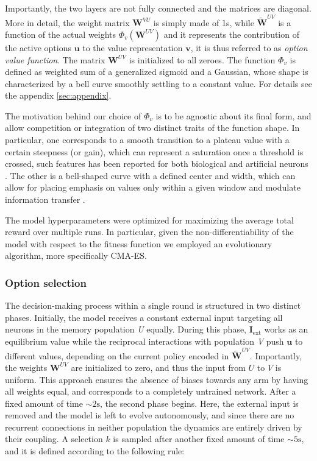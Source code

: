 \noindent Importantly, the two layers are not fully connected and the matrices are diagonal.
More in detail, the weight matrix $\textbf{W}^{VU}$ is simply made of $1$s, while $\widetilde{\textbf{W}}^{UV}$ is a function of the actual weights $\Phi_{v}(\textbf{W}^{UV})$ and it represents the contribution of the active options $\textbf{u}$ to the value representation $\textbf{v}$, it is thus
referred to as \textit{option value function}. The matrix $\textbf{W}^{UV}$ is initialized to all zeroes.
The function $\Phi_{v}$ is defined as weighted sum of a generalized sigmoid and a Gaussian, whose shape is characterized by a bell curve smoothly settling to a constant value. For details see the appendix \ref{sec:appendix}.

The motivation behind our choice of $\Phi_{v}$ is to be agnostic about its final form, and allow competition or integration of two distinct traits of the function shape.
In particular, one corresponds to a smooth transition to a plateau value with a certain steepness (or gain), which can represent a saturation once a threshold is crossed, such features has been reported for both biological and artificial neurons \cite{ockerFlexibleNeuralConnectivity2020, apicellaSurveyModernTrainable2021}.
The other is a bell-shaped curve with a defined center and width, which can allow for placing emphasis on values only within a given window and modulate information transfer \cite{millerCombinedMechanismsNeural2019}.

The model hyperparameters were optimized for maximizing the average total reward over multiple runs. In particular, given the non-differentiability of the model with respect to the fitness function we employed an evolutionary algorithm, more specifically CMA-ES.

\subsubsection{Option selection}
The decision-making process within a single round is structured in two distinct phases. Initially, the model receives a constant external input targeting all neurons in the memory population \textit{U} equally.
During this phase, $\textbf{I}_{\text{ext}}$ works as an equilibrium value while the reciprocal interactions with population \textit{V} push $\textbf{u}$ to different values, depending on the current policy encoded in $\tilde{\textbf{W}}^{UV}$.
Importantly, the weights $\textbf{W}^{UV}$ are initialized to zero, and thus the input from $U$ to $V$ is uniform. This approach ensures the absence of biases towards any arm by having all weights equal, and corresponds to a completely untrained network.
After a fixed amount of time $\sim 2 \text{s}$, the second phase begins. Here, the external input is removed and the model is left to evolve autonomously, and since there are no recurrent connections in neither population the dynamics are entirely driven by their coupling.
A selection $k$ is sampled after another fixed amount of time $\sim 5 \text{s}$, and it is defined according to the following rule:

